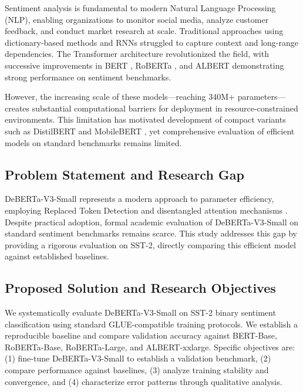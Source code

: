 \documentclass[pdflatex,sn-mathphys-num]{sn-jnl}
\theoremstyle{thmstyleone}%
\theoremstyle{thmstyletwo}%
\theoremstyle{thmstylethree}%
\begin{document}
Sentiment analysis is fundamental to modern Natural Language Processing (NLP), enabling organizations to monitor social media, analyze customer feedback, and conduct market research at scale. Traditional approaches using dictionary-based methods and RNNs struggled to capture context and long-range dependencies. The Transformer architecture \cite{vaswani2017attention} revolutionized the field, with successive improvements in BERT \cite{devlin2019bert}, RoBERTa \cite{liu2019roberta}, and ALBERT \cite{lan2020albert} demonstrating strong performance on sentiment benchmarks.

However, the increasing scale of these models—reaching 340M+ parameters—creates substantial computational barriers for deployment in resource-constrained environments. This limitation has motivated development of compact variants such as DistilBERT and MobileBERT \cite{sanh2019distilbert,sun2020mobilebert}, yet comprehensive evaluation of efficient models on standard benchmarks remains limited.

\subsection{Problem Statement and Research Gap}

DeBERTa-V3-Small represents a modern approach to parameter efficiency, employing Replaced Token Detection and disentangled attention mechanisms \cite{he2021deberta,he2023debertav3,clark2020electra}. Despite practical adoption, formal academic evaluation of DeBERTa-V3-Small on standard sentiment benchmarks remains scarce. This study addresses this gap by providing a rigorous evaluation on SST-2, directly comparing this efficient model against established baselines.

\subsection{Proposed Solution and Research Objectives}

We systematically evaluate DeBERTa-V3-Small on SST-2 binary sentiment classification using standard GLUE-compatible training protocols. We establish a reproducible baseline and compare validation accuracy against BERT-Base, RoBERTa-Base, RoBERTa-Large, and ALBERT-xxlarge. Specific objectives are: (1) fine-tune DeBERTa-V3-Small to establish a validation benchmark, (2) compare performance against baselines, (3) analyze training stability and convergence, and (4) characterize error patterns through qualitative analysis.
\end{document}
